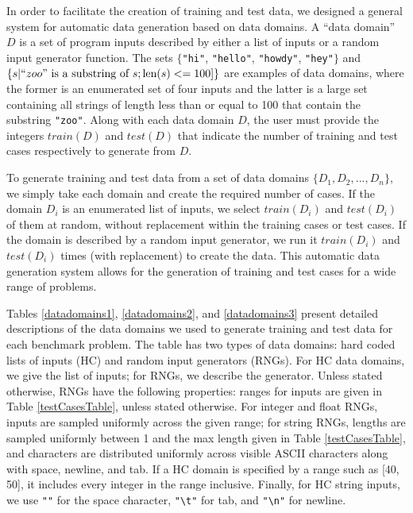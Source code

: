 \documentclass{sig-alternate}
\begin{document}

In order to facilitate the creation of training and test data, we designed a general system for automatic data generation based on data domains. A ``data domain'' $D$ is a set of program inputs described by either a list of inputs or a random input generator function. The sets $\{$\texttt{"hi"}, \texttt{"hello"}, \texttt{"howdy"}, \texttt{"hey"}$\}$ and $\{s | ``zoo" \text{ is a substring of } s; \text{len}(s) <= 100] \}$ are examples of data domains, where the former is an enumerated set of four inputs and the latter is a large set containing all strings of length less than or equal to 100 that contain the substring \texttt{"zoo"}. Along with each data domain $D$, the user must provide the integers $train(D)$ and $test(D)$ that indicate the number of training and test cases respectively to generate from $D$.

To generate training and test data from a set of data domains $\{D_1, D_2, ..., D_n \}$, we simply take each domain and create the required number of cases. If the domain $D_i$ is an enumerated list of inputs, we select $train(D_i)$ and $test(D_i)$ of them at random, without replacement within the training cases or test cases. If the domain is described by a random input generator, we run it $train(D_i)$ and $test(D_i)$ times (with replacement) to create the data. This automatic data generation system allows for the generation of training and test cases for a wide range of problems.


Tables \ref{datadomains1}, \ref{datadomains2}, and \ref{datadomains3} present detailed descriptions of the data domains we used to generate training and test data for each benchmark problem. The table has two types of data domains: hard coded lists of inputs (HC) and random input generators (RNGs). For HC data domains, we give the list of inputs; for RNGs, we describe the generator. Unless stated otherwise, RNGs have the following properties: ranges for inputs are given in Table \ref{testCasesTable}, unless stated otherwise. For integer and float RNGs, inputs are sampled uniformly across the given range; for string RNGs, lengths are sampled uniformly between 1 and the max length given in Table \ref{testCasesTable}, and characters are distributed uniformly across visible ASCII characters along with space, newline, and tab. If a HC domain is specified by a range such as [40, 50], it includes every integer in the range inclusive. Finally, for HC string inputs, we use \texttt{"\textvisiblespace"} for the space character, \texttt{"\textbackslash t"} for tab, and \texttt{"\textbackslash n"} for newline.
\end{document}
